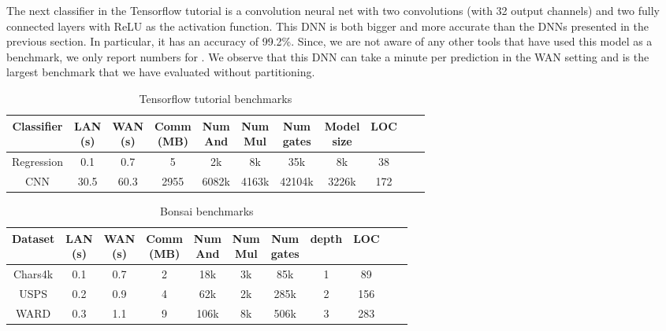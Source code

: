 The next classifier in the Tensorflow tutorial is a convolution neural net with two convolutions
(with 32 output channels) and two fully connected layers with ReLU as the activation function.
This DNN is both bigger and more accurate than the DNNs presented in the previous section.
In particular, it has an accuracy of 99.2\%.
Since, we are not aware of any other tools that have used this
model as a benchmark, we only report numbers for \tool.
We observe that this DNN can take a minute per prediction in the WAN
setting and is the largest benchmark that we have evaluated without
partitioning.


\setlength\tabcolsep{2.5pt}
\begin{table}
\footnotesize
\begin{tabular}{|c|c|c|c |c|c|c|c|c|c | c}
\hline
Classifier       & \thead{LAN  \\ (s)} & \thead{WAN \\(s)} & \thead{Comm \\(MB)}  & \thead{Num \\ And} & \thead{Num \\ Mul} & \thead{Num \\ gates} & \thead{Model \\size} & LOC\\
\hline
Regression &  0.1         & 0.7         & 5            & 2k    & 8k    &  35k    & 8k   & 38\\
\hline
CNN        &  30.5        & 60.3        & 2955         & 6082k & 4163k &  42104k & 3226k& 172\\
\hline
\end{tabular}

 \caption{Tensorflow tutorial benchmarks}
 \label{tab:tf} 
\end{table}
\setlength\tabcolsep{3.5pt}
\begin{table}
\footnotesize
\begin{tabular}{|c|c|c|c |c|c|c|c|c|c | c|}
\hline
Dataset       & \thead{LAN \\(s)} & \thead{WAN \\(s)} & \thead{Comm \\ (MB)}  & \thead{Num \\ And} & \thead{Num \\ Mul} & \thead{Num \\ gates} & depth & LOC\\
\hline
Chars4k    &  0.1         & 0.7         & 2            & 18k    & 3k    &  85k     & 1   & 89\\
\hline
USPS       &  0.2         & 0.9         & 4            & 62k    & 2k    &  285k    & 2   & 156\\
\hline
WARD       &  0.3         & 1.1         & 9            & 106k    & 8k    &  506k    & 3   & 283\\
\hline
\end{tabular}

 \caption{Bonsai benchmarks}
 \label{tab:bonsai} 
\end{table}

